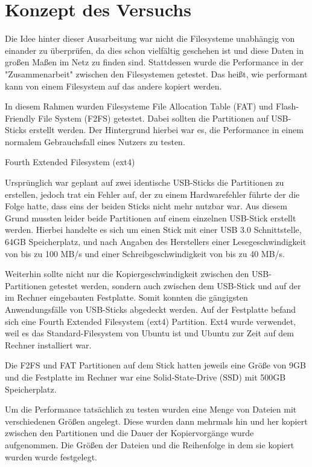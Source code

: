 \documentclass[11pt,parskip=full]{scrartcl}
\begin{document}
\section{Konzept des Versuchs}
	Die Idee hinter dieser Ausarbeitung war nicht die Filesysteme unabhängig von einander zu überprüfen, da dies schon vielfältig geschehen ist und diese Daten in großen Maßen im Netz zu finden sind. Stattdessen wurde die Performance in der "Zusammenarbeit" zwischen den Filesystemen getestet. Das heißt, wie performant kann von einem Filesystem auf das andere kopiert werden. 
	
	In diesem Rahmen wurden Filesysteme File Allocation Table (FAT) und Flash-Friendly File System (F2FS)  getestet. Dabei sollten die Partitionen auf USB-Sticks erstellt werden. Der Hintergrund hierbei war es, die Performance in einem normalem Gebrauchsfall eines Nutzers zu testen.
	
	Fourth Extended Filesystem (ext4)
	
	Ursprünglich war geplant auf zwei identische USB-Sticks die Partitionen zu erstellen, jedoch trat ein Fehler auf, der zu einem Hardwarefehler führte der die Folge hatte, dass eins der beiden Sticks nicht mehr nutzbar war. Aus diesem Grund mussten leider beide Partitionen auf einem einzelnen USB-Stick erstellt werden. Hierbei handelte es sich um einen Stick mit einer USB 3.0 Schnittstelle, 64GB Speicherplatz, und nach Angaben des Herstellers einer Lesegeschwindigkeit von bis zu 100 MB/s und einer Schreibgeschwindigkeit von bis zu 40 MB/s. 
	
	Weiterhin sollte nicht nur die Kopiergeschwindigkeit zwischen den USB-Partitionen getestet werden, sondern auch zwischen dem USB-Stick und auf der im Rechner eingebauten Festplatte. Somit konnten die gängigsten Anwendungsfälle von USB-Sticks abgedeckt werden. Auf der Festplatte befand sich eine Fourth Extended Filesystem (ext4) Partition. Ext4 wurde verwendet, weil es das Standard-Filesystem von Ubuntu ist und Ubuntu zur Zeit auf dem Rechner installiert war.
	
	Die F2FS und FAT Partitionen auf dem Stick hatten jeweils eine Größe von 9GB und die Festplatte im Rechner war eine Solid-State-Drive (SSD) mit 500GB Speicherplatz.
	
	Um die Performance tatsächlich zu testen wurden eine Menge von Dateien mit verschiedenen Größen angelegt. Diese wurden dann mehrmals hin und her kopiert zwischen den Partitionen und die Dauer der Kopiervorgänge wurde aufgenommen. Die Größen der Dateien und die Reihenfolge in dem sie kopiert wurden wurde festgelegt. 
	
\end{document}
